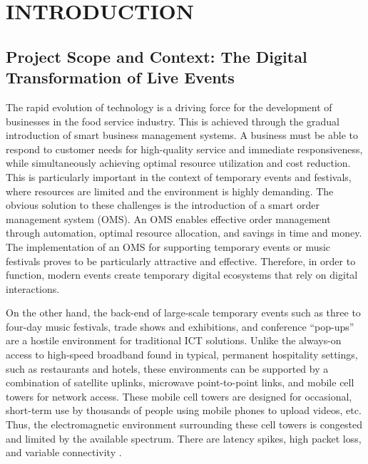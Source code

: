 \chapter{INTRODUCTION}

\section{Project Scope and Context: The Digital Transformation of Live Events}

The rapid evolution of technology is a driving force for the development of businesses in the food service industry. This is achieved through the gradual introduction of smart business management systems. A business must be able to respond to customer needs for high-quality service and immediate responsiveness, while simultaneously achieving optimal resource utilization and cost reduction. This is particularly important in the context of temporary events and festivals, where resources are limited and the environment is highly demanding. The obvious solution to these challenges is the introduction of a smart order management system (OMS). An OMS enables effective order management through automation, optimal resource allocation, and savings in time and money. The implementation of an OMS for supporting temporary events or music festivals proves to be particularly attractive and effective. Therefore, in order to function, modern events create temporary digital ecosystems that rely on digital interactions.

On the other hand, the back-end of large-scale temporary events such as three to four-day music festivals, trade shows and exhibitions, and conference ``pop-ups'' are a hostile environment for traditional ICT solutions. Unlike the always-on access to high-speed broadband found in typical, permanent hospitality settings, such as restaurants and hotels, these environments can be supported by a combination of satellite uplinks, microwave point-to-point links, and mobile cell towers for network access. These mobile cell towers are designed for occasional, short-term use by thousands of people using mobile phones to upload videos, etc. Thus, the electromagnetic environment surrounding these cell towers is congested and limited by the available spectrum. There are latency spikes, high packet loss, and variable connectivity \cite{ibm2019cloud}.

